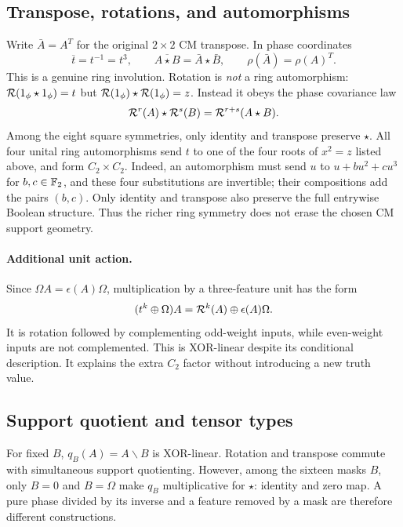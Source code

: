 \subsection{Transpose, rotations, and automorphisms}
Write $\bar A=A^T$ for the original $2\times2$ CM transpose. In phase coordinates
\begin{equation}
 \overline{t}=t^{-1}=t^3,\qquad
 \overline{A\star B}=\bar A\star\bar B,\qquad
 \rho(\bar A)=\rho(A)^T.
\end{equation}
This is a genuine ring involution. Rotation is \emph{not} a ring automorphism: $\mathcal R(1_{\phi}\star1_{\phi})=t$ but $\mathcal R(1_{\phi})\star\mathcal R(1_{\phi})=z$. Instead it obeys the phase covariance law
\begin{equation}
 \mathcal R^r(A)\star\mathcal R^s(B)=\mathcal R^{r+s}(A\star B).
\end{equation}
Among the eight square symmetries, only identity and transpose preserve $\star$. All four unital ring automorphisms send $t$ to one of the four roots of $x^2=z$ listed above, and form $C_2\times C_2$. Indeed, an automorphism must send $u$ to $u+b u^2+c u^3$ for $b,c\in\mathbb F_2$, and these four substitutions are invertible; their compositions add the pairs $(b,c)$. Only identity and transpose also preserve the full entrywise Boolean structure. Thus the richer ring symmetry does not erase the chosen CM support geometry.

\paragraph{Additional unit action.}
Since $\Omega A=\epsilon(A)\Omega$, multiplication by a three-feature unit has the form
\begin{equation}\label{eq:unitaction}
 (t^k\oplus\Omega)A=\mathcal R^k(A)\oplus\epsilon(A)\Omega.
\end{equation}
It is rotation followed by complementing odd-weight inputs, while even-weight inputs are not complemented. This is XOR-linear despite its conditional description. It explains the extra $C_2$ factor without introducing a new truth value.

\subsection{Support quotient and tensor types}
For fixed $B$, $q_B(A)=A\backslash B$ is XOR-linear. Rotation and transpose commute with simultaneous support quotienting. However, among the sixteen masks $B$, only $B=0$ and $B=\Omega$ make $q_B$ multiplicative for $\star$: identity and zero map. A pure phase divided by its inverse and a feature removed by a mask are therefore different constructions.

